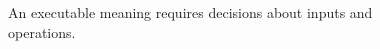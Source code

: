 \begin{figure}[H]
\centering
{}
\caption{An executable meaning requires decisions about inputs and operations.}\label{fig:teach-P-01a-language-lesson-01}
\end{figure}
